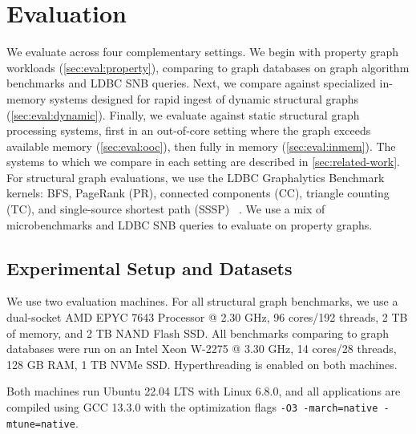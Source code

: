 \chapter{Evaluation}
\label{sec:evaluation}

We evaluate \project{} across four complementary settings.
We begin with property graph workloads (\autoref{sec:eval:property}), comparing \project{} to graph databases on graph algorithm benchmarks and LDBC SNB queries.
Next, we compare against specialized in-memory systems designed for rapid ingest of dynamic structural graphs (\autoref{sec:eval:dynamic}).
Finally, we evaluate against static structural graph processing systems, first in an out-of-core setting where the graph exceeds available memory (\autoref{sec:eval:ooc}), then fully in memory (\autoref{sec:eval:inmem}).
The systems to which we compare in each setting are described in \autoref{sec:related-work}.
For structural graph evaluations, we use the LDBC Graphalytics Benchmark kernels: BFS, PageRank (PR), connected components (CC), triangle counting (TC), and single-source shortest path (SSSP) ~\cite{LDBCGrapalytics22:online}.
We use a mix of microbenchmarks and LDBC SNB queries to evaluate \project{} on property graphs.

\section{Experimental Setup and Datasets}
\label{sec:eval:setup}

We use two evaluation machines.
For all structural graph benchmarks, we use a dual-socket AMD EPYC 7643 Processor @ 2.30 GHz, 96 cores/192 threads, 2 TB of memory, and 2 TB NAND Flash SSD.
All benchmarks comparing \project{} to graph databases were run on an Intel Xeon W-2275 @ 3.30 GHz, 14 cores/28 threads, 128 GB RAM, 1 TB NVMe SSD.
Hyperthreading is enabled on both machines.

Both machines run Ubuntu 22.04 LTS with Linux 6.8.0, and all applications are compiled using GCC 13.3.0 with the optimization flags \texttt{-O3 -march=native -mtune=native}.

